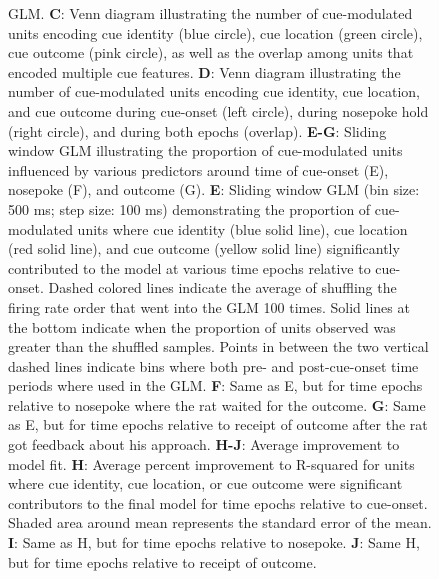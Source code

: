 \documentclass[11pt]{article}
\newcommand{\bsf}[1]{\textbf{#1}}
\begin{document}
\begin{figure}[ht!]
{GLM. \bsf{C}: Venn diagram illustrating the number of cue-modulated units encoding cue identity (blue circle), cue location (green circle), cue outcome (pink circle), as well as the overlap among units that encoded multiple cue features. \bsf{D}: Venn diagram illustrating the number of cue-modulated units encoding cue identity, cue location, and cue outcome during cue-onset (left circle), during nosepoke hold (right circle), and during both epochs (overlap). \bsf{E-G}: Sliding window GLM illustrating the proportion of cue-modulated units influenced by various predictors around time of cue-onset (E), nosepoke (F), and outcome (G). \bsf{E}: Sliding window GLM (bin size: 500 ms; step size: 100 ms) demonstrating the proportion of cue-modulated units where cue identity (blue solid line), cue location (red solid line), and cue outcome (yellow solid line) significantly contributed to the model at various time epochs relative to cue-onset. Dashed colored lines indicate the average of shuffling the firing rate order that went into the GLM 100 times. Solid lines at the bottom indicate when the proportion of units observed was greater than the shuffled samples. Points in between the two vertical dashed lines indicate bins where both pre- and post-cue-onset time periods where used in the GLM. \bsf{F}: Same as E, but for time epochs relative to nosepoke where the rat waited for the outcome. \bsf{G}: Same as E, but for time epochs relative to receipt of outcome after the rat got feedback about his approach. \bsf{H-J}: Average improvement to model fit. \bsf{H}: Average percent improvement to R-squared for units where cue identity, cue location, or cue outcome were significant contributors to the final model for time epochs relative to cue-onset. Shaded area around mean represents the standard error of the mean. \bsf{I}: Same as H, but for time epochs relative to nosepoke. \bsf{J}: Same H, but for time epochs relative to receipt of outcome.}
\label{fig:NP_GLM}
\end{figure} \clearpage
\end{document}
